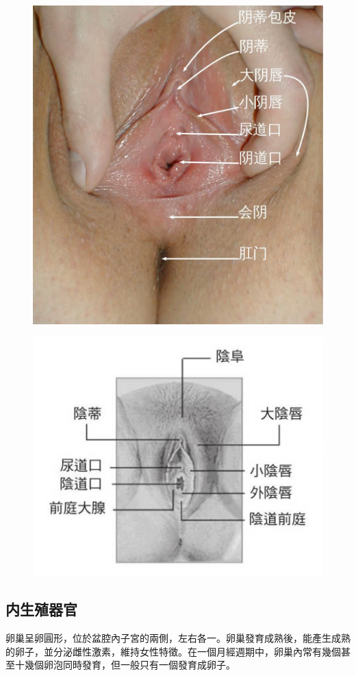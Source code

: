 \documentclass[12pt,UTF8]{ctexbook}
\begin{document}
\begin{figure}
	\centering
	\includegraphics[width=0.7\linewidth]{Images/1}
	\caption{}
	\label{fig:1}
\end{figure}

\begin{figure}
	\centering
	\includegraphics[width=0.7\linewidth]{Images/2}
	\caption{}
	\label{fig:1}
\end{figure}

\subsection{内生殖器官}

卵巢呈卵圓形，位於盆腔內子宮的兩側，左右各一。卵巢發育成熟後，能產生成熟的卵子，並分泌雌性激素，維持女性特徵。在一個月經週期中，卵巢內常有幾個甚至十幾個卵泡同時發育，但一般只有一個發育成卵子。
\end{document}
